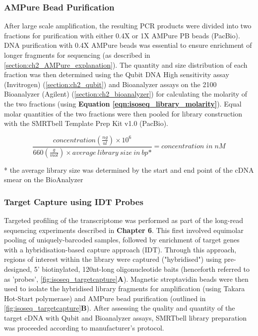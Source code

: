 \subsubsection{AMPure Bead Purification} 
\label{section:ch2_ampurebead_pool} 
After large scale amplification, the resulting PCR products were divided into two fractions for purification with either 0.4X or 1X AMPure PB beads (PacBio). DNA purification with 0.4X AMPure beads was essential to ensure enrichment of longer fragments for sequencing (as described in \cref{section:ch2_AMPure_explanation}). The quantity and size distribution of each fraction was then determined using the Qubit DNA High sensitivity assay (Invitrogen) (\cref{section:ch2_qubit}) and Bioanalyzer assays on the 2100 Bioanalyzer (Agilent) (\cref{section:ch2_bioanalyzer}) for calculating the molarity of the two fractions (using \textbf{Equation \ref{eqn:isoseq_library_molarity}}). Equal molar quantities of the two fractions were then pooled for library construction with the SMRTbell Template Prep Kit v1.0 (PacBio). 

\begin{equation}
	\label{eqn:isoseq_library_molarity}
	\frac{concentration(\frac{ng}{ul})\times 10^6}{660(\frac{g}{mol}) \times average\:library\:size\:in\:bp\mbox{*}} = concentration\;in\; nM
\end{equation}

* the average library size was determined by the start and end point of the cDNA smear on the BioAnalyzer

\subsubsection{Target Capture using IDT Probes} 
\label{section:ch2_targetcapture_explanation} 
Targeted profiling of the transcriptome was performed as part of the long-read sequencing experiments described in \textbf{Chapter 6}. This first involved equimolar pooling of uniquely-barcoded samples, followed by enrichment of target genes with a hybridisation-based capture approach (IDT). Through this approach, regions of interest within the library were captured ("hybridised") using pre-designed, 5’ biotinylated, 120nt-long oligonucleotide baits (henceforth referred to as 'probes', \cref{fig:isoseq_targetcapture}\textbf{A}). Magnetic streptavidin beads were then used to isolate the hybridised library fragments for amplification (using Takara Hot-Start polymerase) and AMPure bead purification (outlined in \cref{fig:isoseq_targetcapture}\textbf{B}). After assessing the quality and quantity of the target cDNA with Qubit and Bioanalyzer assays, SMRTbell library preparation was proceeded according to manufacturer's protocol.  

